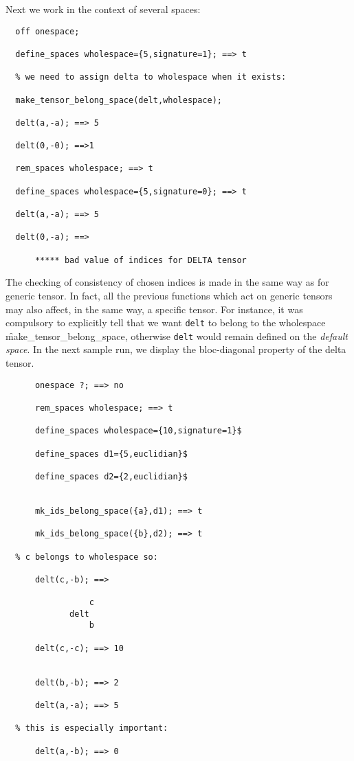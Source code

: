 Next we work in the context of several spaces:
\begin{verbatim}
  off onespace;

  define_spaces wholespace={5,signature=1}; ==> t

  % we need to assign delta to wholespace when it exists:

  make_tensor_belong_space(delt,wholespace);

  delt(a,-a); ==> 5

  delt(0,-0); ==>1

  rem_spaces wholespace; ==> t

  define_spaces wholespace={5,signature=0}; ==> t

  delt(a,-a); ==> 5

  delt(0,-a); ==>

      ***** bad value of indices for DELTA tensor
\end{verbatim}
The checking of consistency of chosen indices is made in the same way as for
generic tensor. In fact, all the previous functions which act on generic tensors
may also affect, in the same way, a specific tensor. For instance, it was
compulsory to explicitly tell that we want \texttt{delt} to belong to the
wholespace \f{make\_tensor\_belong\_space}, otherwise
\texttt{delt} would remain defined on the \emph{default space}.
In the next sample run,  we display the bloc-diagonal property of
the  delta tensor.
\begin{verbatim}
      onespace ?; ==> no

      rem_spaces wholespace; ==> t

      define_spaces wholespace={10,signature=1}$

      define_spaces d1={5,euclidian}$

      define_spaces d2={2,euclidian}$


      mk_ids_belong_space({a},d1); ==> t

      mk_ids_belong_space({b},d2); ==> t

  % c belongs to wholespace so:

      delt(c,-b); ==>

                 c
             delt
                 b

      delt(c,-c); ==> 10


      delt(b,-b); ==> 2

      delt(a,-a); ==> 5

  % this is especially important:

      delt(a,-b); ==> 0
\end{verbatim}
